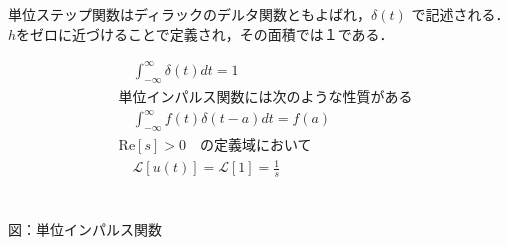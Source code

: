 \documentclass[a4paper,12pt]{article}
\begin{document}
\begin{tcolorbox}[title={[3] 単位インパルス関数 \( x(t) = \delta(t) \)をラプラス変換せよ．}]

  \vspace{4mm}
  
  \quad 単位ステップ関数はディラックのデルタ関数ともよばれ，\( \delta(t) \) で記述される．\\
  \quad \(h\)をゼロに近づけることで定義され，その面積では１である．
  
  \vspace{-4mm}
  
  \begin{minipage}[t]{0.6\linewidth}
      \begin{align*}
          &\quad \mathcal \int_{-\infty}^{\infty} \delta(t) dt = 1 \\[2mm]
          &\text{単位インパルス関数には次のような性質がある} \\[2mm]
          &\quad \mathcal \int_{-\infty}^{\infty} f(t)\delta(t-a) dt = f(a) \\[2mm]
          &\mathrm{Re}[s] > 0 \quad \text{の定義域において} \\[2mm]
          &\quad \mathcal{L}[u(t)] = \mathcal{L}[1] = \frac{1}{s} \\
      \end{align*}
  \end{minipage}
  \hfill
  \begin{minipage}[t]{0.35\linewidth}
  \vspace{10mm}
  \begin{center}
      \\
      図：単位インパルス関数
  \end{center}
  \end{minipage}
  
\end{tcolorbox}
\end{document}
